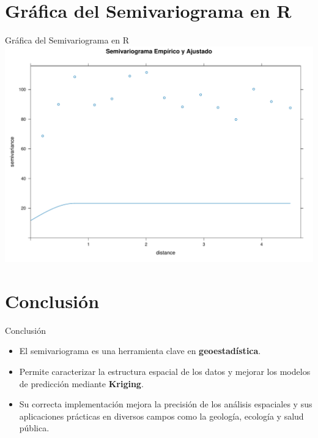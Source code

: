 \documentclass[
  10pt,
  ignorenonframetext,
]{beamer}
\providecommand{\tightlist}{%
  \setlength{\itemsep}{0pt}\setlength{\parskip}{0pt}}
\begin{document}
\section{Gráfica del Semivariograma en
R}\label{gruxe1fica-del-semivariograma-en-r}

\begin{frame}{Gráfica del Semivariograma en R}
\includegraphics{imagenes/Semivariograma_en_R-1.pdf}
\end{frame}

\section{Conclusión}\label{conclusiuxf3n}

\begin{frame}{Conclusión}
\begin{itemize}
\tightlist
\item
  El semivariograma es una herramienta clave en \textbf{geoestadística}.
\item
  Permite caracterizar la estructura espacial de los datos y mejorar los
  modelos de predicción mediante \textbf{Kriging}.
\item
  Su correcta implementación mejora la precisión de los análisis
  espaciales y sus aplicaciones prácticas en diversos campos como la
  geología, ecología y salud pública.
\end{itemize}
\end{frame}
\end{document}
